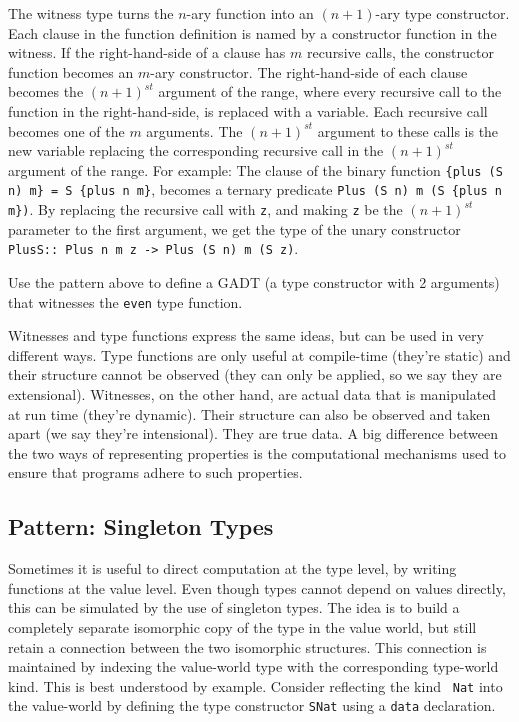 \documentclass[11pt,twoside,A4]{llncs}
\begin{document}
The witness
type turns the $n$-ary function into an $(n+1)$-ary type constructor.
Each clause in the function definition is named by a constructor
function in the witness. If the right-hand-side of a clause has
$m$ recursive calls, the constructor function becomes
an $m$-ary constructor. The right-hand-side of each clause becomes
the $(n+1)^{st}$ argument of the range, where every recursive call
to the function in the right-hand-side, is replaced with a variable.
Each recursive call becomes one of the $m$ arguments.
The $(n+1)^{st}$ argument to these calls
is the new variable replacing the corresponding recursive
call in the $(n+1)^{st}$ argument of the
range. For example: The clause of the
binary function {\small \verb+{plus (S n) m} = S {plus n m}+}, becomes
a ternary predicate {\small \verb+Plus (S n) m (S {plus n m})+}. By replacing
the recursive call with {\tt z}, and making {\tt z} be the $(n+1)^{st}$ parameter
to the first argument, we get the type of the unary constructor\\
{\small \verb+PlusS:: Plus n m z -> Plus (S n) m (S z)+}.

\begin{exercise}\label{EvenWitness}
Use the pattern above to define a GADT (a type constructor
with 2 arguments) that witnesses the {\tt even} type function.
\end{exercise}

Witnesses and type functions express the same ideas, but can be used
in very different ways.  Type functions are only useful at compile-time 
(they're static) and their structure cannot be observed (they
can only be applied, so we say they are extensional). Witnesses, on
the other hand, are actual data that is manipulated at run time
(they're dynamic). Their structure can also be observed and taken
apart (we say they're intensional). They are true data. A big
difference between the two ways of representing properties is the
computational mechanisms used to ensure that programs adhere to such
properties.


 
\subsection{Pattern: Singleton Types}  \label{singleton} Sometimes
it is useful to direct computation at the type level, by
writing functions at the value level. Even though types
cannot depend on values directly, this can be simulated by the use of
singleton types. The idea is to build a completely separate
isomorphic copy of the type in the value world, but still
retain a connection between the two isomorphic structures.
This connection is maintained by indexing the value-world
type with the corresponding type-world kind. This is best
understood by example. Consider reflecting the kind {\tt
Nat} into the value-world by defining the type constructor
{\tt SNat} using a {\tt data} declaration.
\end{document}
